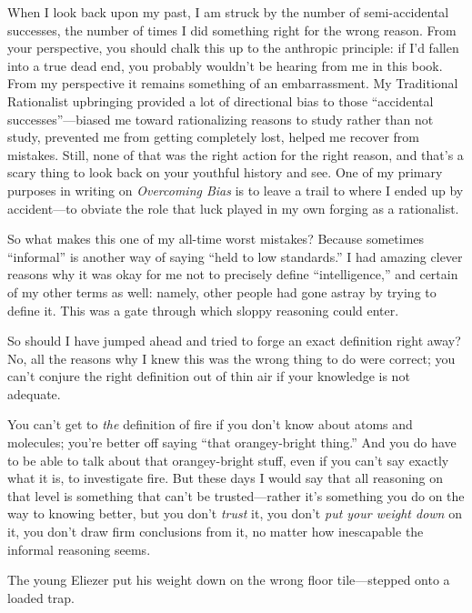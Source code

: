 {
 When I look back upon my past, I am struck by the number of
semi-accidental successes, the number of times I did something right
for the wrong reason. From your perspective, you should chalk this up
to the anthropic principle: if I'd fallen into a true
dead end, you probably wouldn't be hearing from me in
this book. From my perspective it remains something of an
embarrassment. My Traditional Rationalist upbringing provided a lot of
directional bias to those ``accidental
successes''---biased me toward rationalizing reasons
to study rather than not study, prevented me from getting completely
lost, helped me recover from mistakes. Still, none of that was the
right action for the right reason, and that's a scary
thing to look back on your youthful history and see. One of my primary
purposes in writing on \textit{Overcoming Bias} is to leave a trail to
where I ended up by accident---to obviate the role that luck played in
my own forging as a rationalist.}

{
 So what makes this one of my all-time worst mistakes? Because
sometimes ``informal'' is another
way of saying ``held to low
standards.'' I had amazing clever reasons why it was
okay for me not to precisely define
``intelligence,'' and certain of my
other terms as well: namely, other people had gone astray by trying to
define it. This was a gate through which sloppy reasoning could enter.}

{
 So should I have jumped ahead and tried to forge an exact
definition right away? No, all the reasons why I knew this was the
wrong thing to do were correct; you can't conjure the
right definition out of thin air if your knowledge is not adequate.}

{
 You can't get to \textit{the} definition of fire
if you don't know about atoms and molecules;
you're better off saying ``that
orangey-bright thing.'' And you do have to be able to
talk about that orangey-bright stuff, even if you can't
say exactly what it is, to investigate fire. But these days I would say
that all reasoning on that level is something that
can't be trusted---rather it's
something you do on the way to knowing better, but you
don't \textit{trust} it, you don't
\textit{put your weight down} on it, you don't draw
firm conclusions from it, no matter how inescapable the informal
reasoning seems.}

{
 The young Eliezer put his weight down on the wrong floor
tile---stepped onto a loaded trap.}

{\centering
 \ ~
\par}

